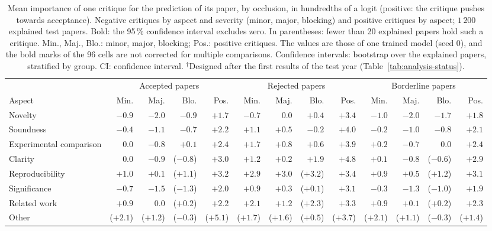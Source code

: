 \begin{table}[t]
\centering
\footnotesize
\setlength{\tabcolsep}{3pt}
\caption{Mean importance of one critique for the prediction of its paper, by occlusion, in hundredths of a logit (positive: the critique pushes towards acceptance). Negative critiques by aspect and severity (minor, major, blocking) and positive critiques by aspect; $1\,200$ explained test papers. Bold: the 95\,\% confidence interval excludes zero. In parentheses: fewer than 20 explained papers hold such a critique. Min., Maj., Blo.: minor, major, blocking; Pos.: positive critiques. The values are those of one trained model (seed 0), and the bold marks of the 96 cells are not corrected for multiple comparisons. Confidence intervals: bootstrap over the explained papers, stratified by group. CI: confidence interval. $^{\dagger}$Designed after the first results of the test year (Table~\ref{tab:analysis-status}).}
\label{tab:explain-aspect-severity}
\begin{tabular}{@{}lrrrrrrrrrrrr@{}}
\toprule
 & \multicolumn{4}{c}{Accepted papers} & \multicolumn{4}{c}{Rejected papers} & \multicolumn{4}{c}{Borderline papers} \\
\cmidrule(lr){2-5} \cmidrule(lr){6-9} \cmidrule(lr){10-13}
Aspect & Min. & Maj. & Blo. & Pos. & Min. & Maj. & Blo. & Pos. & Min. & Maj. & Blo. & Pos. \\
\midrule
Novelty & $-0.9$ & $\mathbf{-2.0}$ & $-0.9$ & $\mathbf{+1.7}$ & $\mathbf{-0.7}$ & $0.0$ & $+0.4$ & $\mathbf{+3.4}$ & $\mathbf{-1.0}$ & $\mathbf{-2.0}$ & $\mathbf{-1.7}$ & $\mathbf{+1.8}$ \\
Soundness & $\mathbf{-0.4}$ & $\mathbf{-1.1}$ & $\mathbf{-0.7}$ & $\mathbf{+2.2}$ & $\mathbf{+1.1}$ & $\mathbf{+0.5}$ & $-0.2$ & $\mathbf{+4.0}$ & $\mathbf{-0.2}$ & $\mathbf{-1.0}$ & $\mathbf{-0.8}$ & $\mathbf{+2.1}$ \\
Experimental comparison & $0.0$ & $\mathbf{-0.8}$ & $+0.1$ & $\mathbf{+2.4}$ & $\mathbf{+1.7}$ & $\mathbf{+0.8}$ & $\mathbf{+0.6}$ & $\mathbf{+3.9}$ & $\mathbf{+0.2}$ & $\mathbf{-0.7}$ & $0.0$ & $\mathbf{+2.4}$ \\
Clarity & $0.0$ & $\mathbf{-0.9}$ & ($-0.8$) & $\mathbf{+3.0}$ & $\mathbf{+1.2}$ & $+0.2$ & $\mathbf{+1.9}$ & $\mathbf{+4.8}$ & $+0.1$ & $\mathbf{-0.8}$ & ($-0.6$) & $\mathbf{+2.9}$ \\
Reproducibility & $\mathbf{+1.0}$ & $+0.1$ & ($+1.1$) & $\mathbf{+3.2}$ & $\mathbf{+2.9}$ & $\mathbf{+3.0}$ & ($+3.2$) & $\mathbf{+3.4}$ & $\mathbf{+0.9}$ & $\mathbf{+0.5}$ & ($+1.2$) & $\mathbf{+3.1}$ \\
Significance & $\mathbf{-0.7}$ & $\mathbf{-1.5}$ & ($-1.3$) & $\mathbf{+2.0}$ & $\mathbf{+0.9}$ & $+0.3$ & ($+0.1$) & $\mathbf{+3.1}$ & $-0.3$ & $\mathbf{-1.3}$ & ($-1.0$) & $\mathbf{+1.9}$ \\
Related work & $\mathbf{+0.9}$ & $0.0$ & ($+0.2$) & $\mathbf{+2.2}$ & $\mathbf{+2.1}$ & $\mathbf{+1.2}$ & ($+2.3$) & $\mathbf{+3.3}$ & $\mathbf{+0.9}$ & $+0.1$ & ($+0.2$) & $\mathbf{+2.3}$ \\
Other & ($+2.1$) & ($+1.2$) & ($-0.3$) & ($+5.1$) & ($+1.7$) & ($+1.6$) & ($+0.5$) & ($+3.7$) & ($+2.1$) & ($+1.1$) & ($-0.3$) & ($+1.4$) \\
\bottomrule
\end{tabular}
\end{table}
